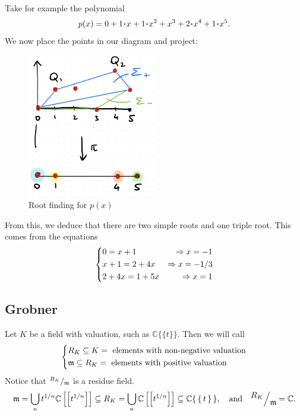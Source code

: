 \documentclass[12pt]{memoir}
\theoremstyle{definition}
\def\CC{{\mathbb C}}
\begin{document}
\begin{Ex}
    Take for example the polynomial 
    $$p(x)=0+1\.x+1\.x^2+x^3+2\.x^4+1\.x^5.$$
    We now place the points in our diagram and project:
    
    \begin{figure}[h!]
        \centering
        \includegraphics[width=0.5\textwidth]{figs/fig6-2CombinatorializationExample.png}
        \caption{Root finding for $p(x)$}
        \label{fig:6.2-CombinatorializationExample}
    \end{figure}

    From this, we deduce that there are two simple roots and one triple root. This comes from the equations
    $$
    \left\lbrace
    \begin{aligned}
        &0=x+1&\Rightarrow x=-1\\
        &x+1=2+4x&\Rightarrow x=-1/3\\
        &2+4x=1+5x&\Rightarrow x=1
    \end{aligned}
    \right.
    $$
\end{Ex}



\subsection{Grobner}

Let $K$ be a field with valuation, such as $\CC\{\{t\}\}$. Then we will call$$
\left\lbrace
\begin{aligned}
    &R_K\subseteq K=\text{ elements with non-negative valuation}\\
    &\mathfrak{m}\subseteq R_K=\text{ elements with positive valuation}
\end{aligned}
\right.
$$
Notice that $\quot{R_K}{\lie{m}}$ is a residue field. 
$$\lie{m}=\bigcup_nt^{1/n}\bC\bonj{\bonj{t^{1/n}}}\subseteq R_K=\bigcup_n\bC\bonj{\bonj{t^{1/n}}}\subseteq\bC\set{\set{t}},\word{and}\quot{R_K}{\lie{m}}=\bC.$$
\end{document}
